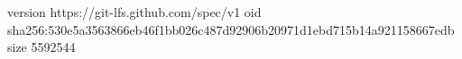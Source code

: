 version https://git-lfs.github.com/spec/v1
oid sha256:530e5a3563866eb46f1bb026c487d92906b20971d1ebd715b14a921158667edb
size 5592544
